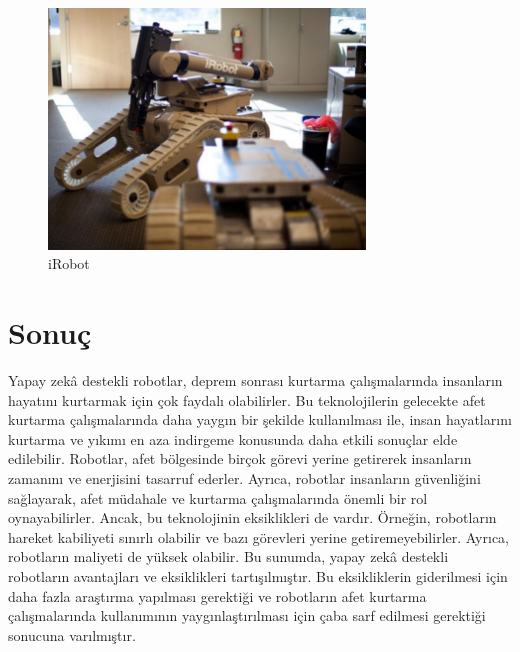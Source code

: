 \documentclass{article}
\begin{document}
\begin{figure}[h]
\centering
\includegraphics[width=0.75\textwidth]{Images/Resim3.jpg}
\caption{iRobot}
\end{figure}

\section*{Sonuç}
Yapay zekâ destekli robotlar, deprem sonrası kurtarma çalışmalarında insanların hayatını kurtarmak için çok faydalı olabilirler. Bu teknolojilerin gelecekte afet kurtarma çalışmalarında daha yaygın bir şekilde kullanılması ile, insan hayatlarını kurtarma ve yıkımı en aza indirgeme konusunda daha etkili sonuçlar elde edilebilir. Robotlar, afet bölgesinde birçok görevi yerine getirerek insanların zamanını ve enerjisini tasarruf ederler. Ayrıca, robotlar insanların güvenliğini sağlayarak, afet müdahale ve kurtarma çalışmalarında önemli bir rol oynayabilirler. Ancak, bu teknolojinin eksiklikleri de vardır. Örneğin, robotların hareket kabiliyeti sınırlı olabilir ve bazı görevleri yerine getiremeyebilirler. Ayrıca, robotların maliyeti de yüksek olabilir. Bu sunumda, yapay zekâ destekli robotların avantajları ve eksiklikleri tartışılmıştır. Bu eksikliklerin giderilmesi için daha fazla araştırma yapılması gerektiği ve robotların afet kurtarma çalışmalarında kullanımının yaygınlaştırılması için çaba sarf edilmesi gerektiği sonucuna varılmıştır.
\end{document}
